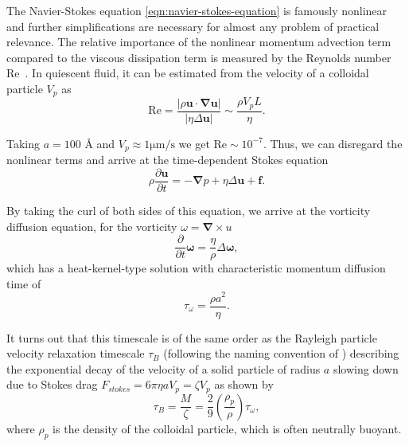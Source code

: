 \documentclass[physics]{doctoral}
\newcommand{\pd}{\partial}
\newcommand{\Reynolds}{\mathrm{Re}}
\begin{document}
The Navier-Stokes equation \eqref{eqn:navier-stokes-equation} is famously nonlinear and further simplifications are necessary for almost any problem of practical relevance.
The relative importance of the nonlinear momentum advection term compared to the viscous dissipation term is measured by the Reynolds number $\Reynolds$~\cite{Reynolds_1883}.
In quiescent fluid, it can be estimated from the velocity of a colloidal particle $V_p$ as
\begin{equation}
    \Reynolds = \frac{|\rho \bm{u} \cdot \bm{\nabla}\bm{u}|}{|\eta \Delta \bm{u}|} \sim \frac{\rho V_p L}{\eta}.
    \label{eqn:reynolds-based-estimate}
\end{equation}

Taking $a = 100$ \AA{} and $V_p \approx 1 \mathrm{\mu m / s}$  we get $\Reynolds \sim 10^{-7}$.
Thus, we can disregard the nonlinear terms and arrive at the time-dependent Stokes equation
\begin{equation}
    \rho \frac{\pd \bm{u}}{\pd t} = - \bm{\nabla} p + \eta \Delta \bm{u} + \bm{f}.
    \label{eqn:time-dependent-stokes-equation}
\end{equation}

By taking the curl of both sides of this equation, we arrive at the vorticity diffusion equation, for the vorticity $\omega = \bm{\nabla} \times u$
\begin{equation}
    \frac{\pd}{\pd t} \bm{\omega}  = \frac{\eta}{\rho} \Delta \bm{\omega} , \label{eqn:vorticity-diffusion}
\end{equation}
which has a heat-kernel-type solution with characteristic momentum diffusion time of
\begin{equation}
    \tau_\omega = \frac{\rho a^2}{\eta}.
    \label{eqn:vorticity-timescale}
\end{equation}

It turns out that this timescale is of the same order as the Rayleigh particle velocity relaxation timescale $\tau_B$ (following the naming convention of \textcite{vanKampen_2011}) describing the exponential decay of the velocity of a solid particle of radius $a$ slowing down due to Stokes drag $F_{stokes} = 6 \pi \eta a V_p = \zeta V_p$ as shown by
\begin{equation}
    \tau_B = \frac{M}{\zeta} = \frac{2}{9} \left( \frac{\rho_p}{\rho} \right) \tau_\omega, \label{eqn:raighley-timescale}
\end{equation}
where $\rho_p$ is the density of the colloidal particle, which is often neutrally buoyant.
\end{document}
